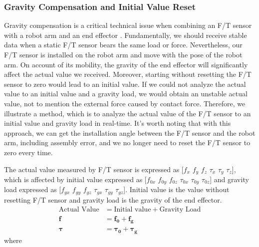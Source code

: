 \subsubsection{Gravity Compensation and Initial Value Reset}
\hspace*{6mm}Gravity compensation is a critical technical issue when combining an F/T sensor with a robot arm and an end effector \cite{8997006}. 
Fundamentally, we should receive stable data when a static F/T sensor bears the same load or force. Nevertheless, our F/T sensor is installed on the robot arm and move with the pose of the robot arm. On account of its mobility, the gravity of the end effector will significantly affect the actual value we received. Moreover, starting without resetting the F/T sensor to zero would lead to an initial value. If we could not analyze the actual value to an initial value and a gravity load, we would obtain an unstable actual value, not to mention the external force caused by contact force. Therefore, we illustrate a method, which is to analyze the actual value of the F/T sensor to an initial value and gravity load in real-time. It's worth noting that with this approach, we can get the installation angle between the F/T sensor and the robot arm, including assembly error, and we no longer need to reset the F/T sensor to zero every time.
\par
The actual value measured by F/T sensor is expressed as [$f_{x}$ $f_{y}$ $f_{z}$ $\tau_{x}$ $\tau_{y}$ $\tau_{z}$], which is affected by initial value expressed as [$f_{0x}$ $f_{0y}$ $f_{0z}$ $\tau_{0x}$ $\tau_{0y}$ $\tau_{0z}$] and gravity load expressed as [$f_{gx}$ $f_{gy}$ $f_{gz}$ $\tau_{gx}$ $\tau_{gy}$ $\tau_{gz}$]. Initial value is the value without resetting F/T sensor and gravity load is the gravity of the end effector.
\begin{equation}\label{eq:gc_iga}
\begin{split}
\text{Actual Value} &= \text{Initial value}	+ \text{Gravity Load}\\
\boldsymbol{f} 		&= 	\boldsymbol{f_0}		+\boldsymbol{f_g}	\\ 
\boldsymbol{\tau}	&=	\boldsymbol{\tau_0}		+\boldsymbol{\tau_g}
\end{split}
\end{equation}
where 
